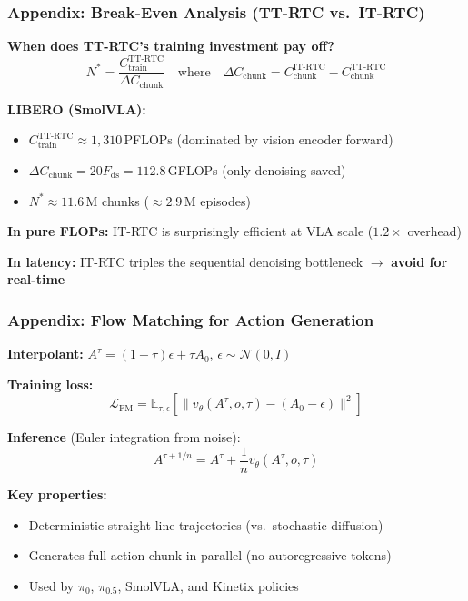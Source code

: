 \documentclass[aspectratio=1610]{beamer}
\begin{document}
\begin{frame}
\frametitle{Appendix: Break-Even Analysis (TT-RTC vs.\ IT-RTC)}

\textbf{When does TT-RTC's training investment pay off?}
\[
N^* = \frac{C_{\text{train}}^{\text{TT-RTC}}}{\Delta C_{\text{chunk}}} \quad\text{where}\quad \Delta C_{\text{chunk}} = C_{\text{chunk}}^{\text{IT-RTC}} - C_{\text{chunk}}^{\text{TT-RTC}}
\]

\vspace{0.3em}
\textbf{LIBERO (SmolVLA):}
\begin{itemize}
    \item $C_{\text{train}}^{\text{TT-RTC}} \approx 1{,}310$\,PFLOPs (dominated by vision encoder forward)
    \item $\Delta C_{\text{chunk}} = 20 F_{\text{ds}} = 112.8$\,GFLOPs (only denoising saved)
    \item $N^* \approx 11.6$\,M chunks ($\approx 2.9$\,M episodes)
\end{itemize}

\vspace{0.3em}
\textbf{In pure FLOPs:} IT-RTC is surprisingly efficient at VLA scale ($1.2\times$ overhead)

\textbf{In latency:} IT-RTC triples the sequential denoising bottleneck $\rightarrow$ \textbf{avoid for real-time}

\end{frame}

\begin{frame}
\frametitle{Appendix: Flow Matching for Action Generation}

\textbf{Interpolant:} $A^\tau = (1 - \tau)\epsilon + \tau A_0$, \quad $\epsilon \sim \mathcal{N}(0, I)$

\vspace{0.3em}
\textbf{Training loss:}
\[
\mathcal{L}_{\text{FM}} = \mathbb{E}_{\tau, \epsilon}\left[\|v_\theta(A^\tau, o, \tau) - (A_0 - \epsilon)\|^2\right]
\]

\vspace{0.3em}
\textbf{Inference} (Euler integration from noise):
\[
A^{\tau + 1/n} = A^\tau + \frac{1}{n}v_\theta(A^\tau, o, \tau)
\]

\vspace{0.3em}
\textbf{Key properties:}
\begin{itemize}
    \item Deterministic straight-line trajectories (vs.\ stochastic diffusion)
    \item Generates full action chunk in parallel (no autoregressive tokens)
    \item Used by $\pi_0$, $\pi_{0.5}$, SmolVLA, and Kinetix policies
\end{itemize}

\end{frame}
\end{document}
